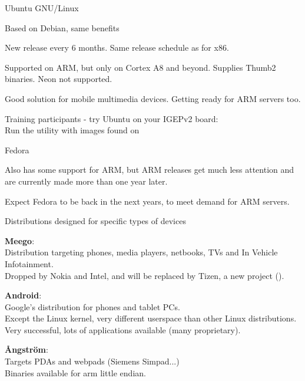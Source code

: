     Ubuntu GNU/Linux
    \startitemize
    \item {}
    \item Based on Debian, same benefits
    \item New release every 6 months. Same release schedule as for
      x86.
    \item Supported on ARM, but only on Cortex A8 and beyond.
      Supplies Thumb2 binaries. Neon not supported.
    \item Good solution for mobile multimedia devices. Getting ready
      for ARM servers too.
    \item Training participants - try Ubuntu on your IGEPv2 board:\\
      Run the  utility with images found on
    \stopitemize


    Fedora
    \startitemize
    \item {}
    \item Also has some support for ARM, but ARM releases get much less
      attention and are currently made more than one year later.
    \item Expect Fedora to be back in the next years, to meet demand for
      ARM servers.
    \stopitemize

    Distributions designed for specific types of devices
    \startitemize
    \item {\bf Meego}: \\
      Distribution targeting phones, media players, netbooks, TVs and
      In Vehicle Infotainment.\\
      Dropped by Nokia and Intel, and will be replaced by Tizen, a new
      project ().
    \item {\bf Android}: \\
      Google's distribution for phones and tablet PCs.\\
      Except the Linux kernel, very different userspace
      than other Linux distributions. Very successful,
      lots of applications available (many proprietary).
    \item {\bf Ångström}: \\
      Targets PDAs and webpads (Siemens Simpad...)\\
      Binaries available for arm little endian.
    \stopitemize

